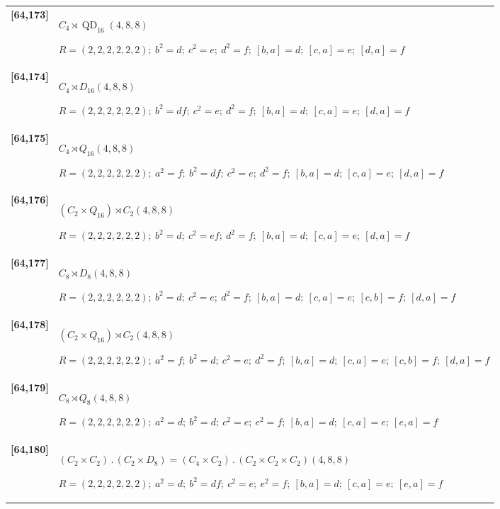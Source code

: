 \documentclass[UTF8,fontset=fandol,11pt,a4paper]{ctexart}
\begin{document}
\begin{longtable}{@{}p{17mm}>{\raggedright\arraybackslash}p{141mm}@{}}
\textbf{[64,173]} & $C_{4}\rtimes \operatorname{QD}_{16}$\quad $(4,8,8)$\par\(R=(2,2,2,2,2,2);\allowbreak\ b^{2}=d;\allowbreak\ c^{2}=e;\allowbreak\ d^{2}=f;\allowbreak\ [b,a]=d;\allowbreak\ [c,a]=e;\allowbreak\ [d,a]=f\)\\[3pt]

\textbf{[64,174]} & $C_{4}\rtimes D_{16}$\quad $(4,8,8)$\par\(R=(2,2,2,2,2,2);\allowbreak\ b^{2}=df;\allowbreak\ c^{2}=e;\allowbreak\ d^{2}=f;\allowbreak\ [b,a]=d;\allowbreak\ [c,a]=e;\allowbreak\ [d,a]=f\)\\[3pt]

\textbf{[64,175]} & $C_{4}\rtimes Q_{16}$\quad $(4,8,8)$\par\(R=(2,2,2,2,2,2);\allowbreak\ a^{2}=f;\allowbreak\ b^{2}=df;\allowbreak\ c^{2}=e;\allowbreak\ d^{2}=f;\allowbreak\ [b,a]=d;\allowbreak\ [c,a]=e;\allowbreak\ [d,a]=f\)\\[3pt]

\textbf{[64,176]} & $(C_{2}\times Q_{16})\rtimes C_{2}$\quad $(4,8,8)$\par\(R=(2,2,2,2,2,2);\allowbreak\ b^{2}=d;\allowbreak\ c^{2}=ef;\allowbreak\ d^{2}=f;\allowbreak\ [b,a]=d;\allowbreak\ [c,a]=e;\allowbreak\ [d,a]=f\)\\[3pt]

\textbf{[64,177]} & $C_{8}\rtimes D_{8}$\quad $(4,8,8)$\par\(R=(2,2,2,2,2,2);\allowbreak\ b^{2}=d;\allowbreak\ c^{2}=e;\allowbreak\ d^{2}=f;\allowbreak\ [b,a]=d;\allowbreak\ [c,a]=e;\allowbreak\ [c,b]=f;\allowbreak\ [d,a]=f\)\\[3pt]

\textbf{[64,178]} & $(C_{2}\times Q_{16})\rtimes C_{2}$\quad $(4,8,8)$\par\(R=(2,2,2,2,2,2);\allowbreak\ a^{2}=f;\allowbreak\ b^{2}=d;\allowbreak\ c^{2}=e;\allowbreak\ d^{2}=f;\allowbreak\ [b,a]=d;\allowbreak\ [c,a]=e;\allowbreak\ [c,b]=f;\allowbreak\ [d,a]=f\)\\[3pt]

\textbf{[64,179]} & $C_{8}\rtimes Q_{8}$\quad $(4,8,8)$\par\(R=(2,2,2,2,2,2);\allowbreak\ a^{2}=d;\allowbreak\ b^{2}=d;\allowbreak\ c^{2}=e;\allowbreak\ e^{2}=f;\allowbreak\ [b,a]=d;\allowbreak\ [c,a]=e;\allowbreak\ [e,a]=f\)\\[3pt]

\textbf{[64,180]} & $(C_{2}\times C_{2})\mathbin{.} (C_{2}\times D_{8}) = (C_{4}\times C_{2})\mathbin{.} (C_{2}\times C_{2}\times C_{2})$\quad $(4,8,8)$\par\(R=(2,2,2,2,2,2);\allowbreak\ a^{2}=d;\allowbreak\ b^{2}=df;\allowbreak\ c^{2}=e;\allowbreak\ e^{2}=f;\allowbreak\ [b,a]=d;\allowbreak\ [c,a]=e;\allowbreak\ [e,a]=f\)\\[3pt]


\end{longtable}
\end{document}
